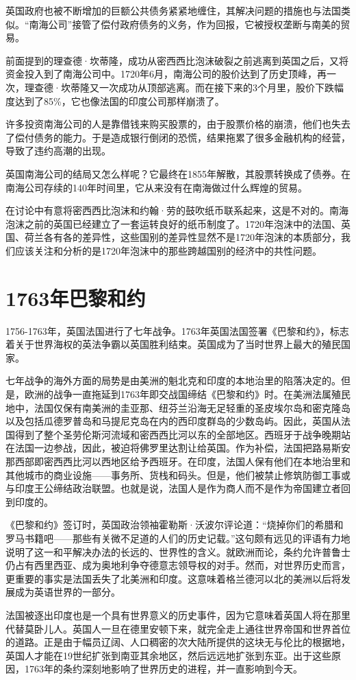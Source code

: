 \documentclass[12pt,oneside]{book}
\begin{document}
英国政府也被不断增加的巨额公共债务紧紧地缠住，其解决问题的措施也与法国类似。“南海公司”接管了偿付政府债务的义务，作为回报，它被授权垄断与南美的贸易。

前面提到的理查德·坎蒂隆，成功从密西西比泡沫破裂之前逃离到英国之后，又将资金投入到了南海公司中。1720年6月，南海公司的股价达到了历史顶峰，再一次，理查德·坎蒂隆又一次成功从顶部逃离。而在接下来的3个月里，股价下跌幅度达到了85\%，它也像法国的印度公司那样崩溃了。

许多投资南海公司的人是靠借钱来购买股票的，由于股票价格的崩溃，他们也失去了偿付债务的能力。于是造成银行倒闭的恐慌，结果拖累了很多金融机构的经营，导致了违约高潮的出现。

英国南海公司的结局又怎么样呢？它最终在1855年解散，其股票转换成了债券。在南海公司存续的140年时间里，它从来没有在南海做过什么辉煌的贸易。


\cite{逃不开的经济周期} 在讨论中有意将密西西比泡沫和约翰·劳的鼓吹纸币联系起来，这是不对的。南海泡沫之前的英国已经建立了一套运转良好的纸币制度了。1720年泡沫中的法国、英国、荷兰各有各的差异性，这些国别的差异性显然不是1720年泡沫的本质部分，我们应该关注和分析的是1720年泡沫中的那些跨越国别的经济中的共性问题。


\chapter{1763年巴黎和约}
1756-1763年，英国法国进行了七年战争。1763年英国法国签署《巴黎和约》，标志着关于世界海权的英法争霸以英国胜利结束。英国成为了当时世界上最大的殖民国家。

\begin{bookref}[frametitle={\cite{全球通史}}]
七年战争的海外方面的局势是由美洲的魁北克和印度的本地治里的陷落决定的。但是，欧洲的战争一直拖延到1763年即交战国缔结《巴黎和约》时。在美洲法属殖民地中，法国仅保有南美洲的圭亚那、纽芬兰沿海无足轻重的圣皮埃尔岛和密克隆岛以及包括瓜德罗普岛和马提尼克岛在内的西印度群岛的少数岛屿。因此，英国从法国得到了整个圣劳伦斯河流域和密西西比河以东的全部地区。西班牙于战争晚期站在法国一边参战，因此，被迫将佛罗里达割让给英国。作为补偿，法国把路易斯安那西部即密西西比河以西地区给予西班牙。在印度，法国人保有他们在本地治里和其他城市的商业设施——事务所、货栈和码头。但是，他们被禁止修筑防御工事或与印度王公缔结政治联盟。也就是说，法国人是作为商人而不是作为帝国建立者回到印度的。

《巴黎和约》签订时，英国政治领袖霍勒斯·沃波尔评论道：“烧掉你们的希腊和罗马书籍吧——那些有关微不足道的人们的历史记载。”这句颇有远见的评语有力地说明了这一和平解决办法的长远的、世界性的含义。就欧洲而论，条约允许普鲁士仍占有西里西亚、成为奥地利争夺德意志领导权的对手。然而，对世界历史而言，更重要的事实是法国丢失了北美洲和印度。这意味着格兰德河以北的美洲以后将发展成为英语世界的一部分。

法国被逐出印度也是一个具有世界意义的历史事件，因为它意味着英国人将在那里代替莫卧儿人。英国人一旦在德里安顿下来，就完全走上通往世界帝国和世界首位的道路。正是由于幅员辽阔、人口稠密的次大陆所提供的这块无与伦比的根据地，英国人才能在19世纪扩张到南亚其余地区，然后远远地扩张到东亚。出于这些原因，1763年的条约深刻地影响了世界历史的进程，并一直影响到今天。
\end{bookref}
\end{document}
